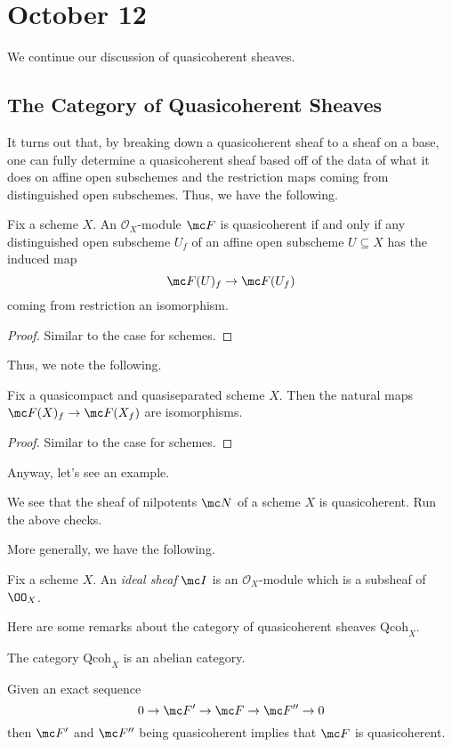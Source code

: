 \documentclass[../notes.tex]{subfiles}
\begin{document}
\section{October 12}

We continue our discussion of quasicoherent sheaves.

\subsection{The Category of Quasicoherent Sheaves}
It turns out that, by breaking down a quasicoherent sheaf to a sheaf on a base, one can fully determine a quasicoherent sheaf based off of the data of what it does on affine open subschemes and the restriction maps coming from distinguished open subschemes. Thus, we have the following.
\begin{lemma}
	Fix a scheme $X$. An $\mathcal O_X$-module $\mc F$ is quasicoherent if and only if any distinguished open subscheme $U_f$ of an affine open subscheme $U\subseteq X$ has the induced map
	\[\mc F(U)_f\to\mc F(U_f)\]
	coming from restriction an isomorphism.
\end{lemma}
\begin{proof}
	Similar to the case for schemes.
\end{proof}
Thus, we note the following.
\begin{lemma} \label{lem:localize-is-good}
	Fix a quasicompact and quasiseparated scheme $X$. Then the natural maps $\mc F(X)_f\to\mc F(X_f)$ are isomorphisms.
\end{lemma}
\begin{proof}
	Similar to the case for schemes.
\end{proof}
Anyway, let's see an example.
\begin{ex}
	We see that the sheaf of nilpotents $\mc N$ of a scheme $X$ is quasicoherent. Run the above checks.
\end{ex}
More generally, we have the following.
\begin{definition}
	Fix a scheme $X$. An \textit{ideal sheaf} $\mc I$ is an $\mathcal O_X$-module which is a subsheaf of $\OO_X$.
\end{definition}
\begin{lemma}
	Here are some remarks about the category of quasicoherent sheaves $\mathrm{Qcoh}_X$.
	\begin{listalph}
		\item The category $\mathrm{Qcoh}_X$ is an abelian category.
		\item Given an exact sequence
		\[0\to\mc F'\to\mc F\to\mc F''\to0\]
		then $\mc F'$ and $\mc F''$ being quasicoherent implies that $\mc F$ is quasicoherent.
	\end{listalph}
\end{lemma}
\end{document}
